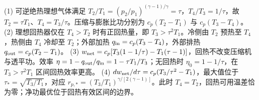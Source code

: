 (1) 可逆绝热理想气体满足 \(T_2/T_1=(p_2/p_1)^{(\gamma-1)/\gamma}=\tau\)，\(T_4/T_3=1/\tau\)，故 \(T_2=\tau T_1\)、\(T_4=T_3/\tau\)。压缩与膨胀比功分别为 \(c_p(T_2-T_1)\) 与 \(c_p(T_3-T_4)\)。
(2) 理想回热器仅在 \(T_4>T_2\) 时有正回热量，即 \(T_3>\tau^2T_1\)。冷侧由 \(T_2\) 预热至 \(T_4\)，热侧由 \(T_4\) 冷却至 \(T_2\)；外部加热 \(q_{\rm in}=c_p(T_3-T_4)\)，外部排热 \(q_{\rm out}=c_p(T_2-T_1)\)。
(3) \(w_{\rm net}=c_p[T_3(1-1/\tau)-T_1(\tau-1)]\)，回热不改变压缩机与透平功。效率 \(\eta=1-q_{\rm out}/q_{\rm in}=1-\tau T_1/T_3\)；无回热时 \(\eta_0=1-1/\tau\)，在 \(T_3>\tau^2T_1\) 区间回热效率更高。
(4) \(dw_{\rm net}/d\tau=c_p(T_3/\tau^2-T_1)\)，最大值位于 \(\tau_*=\sqrt{T_3/T_1}\)，对应 \(r_{p,*}=(T_3/T_1)^{\gamma/[2(\gamma-1)]}\)。此时 \(T_4=T_2\)，回热可用温差恰为零；净功最优位于回热有效区间的边界。
